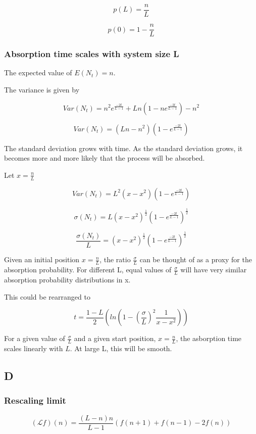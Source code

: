 \documentclass{article}
\begin{document}
$$p(L) = \frac{n}{L}$$

$$p(0) = 1 - \frac{n}{L}$$



\subsubsection{Absorption time scales with system size L}

The expected value of $E(N_t)=n$.

The variance is given by 

$$Var(N_t) = n^2e^{\frac{-2t}{L-1}} + Ln(1-ne^{\frac{-2t}{L-1}}) - n^2$$

$$Var(N_t) = (Ln - n^2)(1- e^{\frac{-2t}{L-1}})$$

The standard deviation grows with time. As the standard deviation grows, it becomes more and more likely that the process will be absorbed.

Let $x = \frac{n}{L}$

$$Var(N_t) = L^2 (x -x^2)(1- e^{\frac{-2t}{L-1}})$$

$$\sigma(N_t) = L (x -x^2)^{\frac{1}{2}}(1- e^{\frac{-2t}{L-1}})^{\frac{1}{2}}$$

$$\frac{\sigma(N_t)}{L} = (x -x^2)^{\frac{1}{2}}(1- e^{\frac{-2t}{L-1}})^{\frac{1}{2}}$$

Given an initial position $x=\frac{n}{L}$, the ratio $\frac{\sigma}{L}$ can be thought of as a proxy for the absorption probability. For different L, equal values of $\frac{\sigma}{L}$ will have very similar absorption probability distributions in x. 

This could be rearranged to

$$t = \frac{1-L}{2}(ln(1-(\frac{\sigma}{L})^2\frac{1}{x-x^2}))$$

For a given value of $\frac{\sigma}{L}$ and a given start position, $x=\frac{n}{L}$, the asborption time scales linearly with $L$. At large L, this will be smooth.


\subsection{D}

\subsubsection{Rescaling limit}

$$(\mathcal{L}f)(n) = \frac{(L-n)n}{L-1}(f(n+1) + f(n-1) - 2f(n))$$
\end{document}
